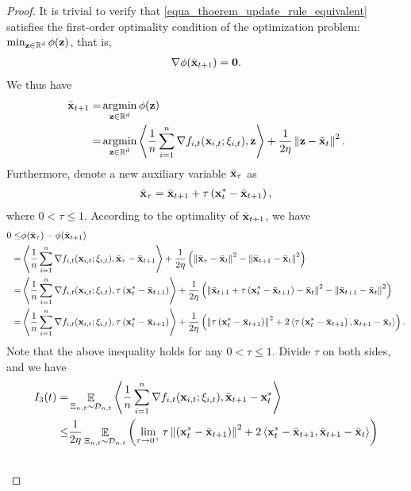 \documentclass{article}
\begin{document}
\begin{proof}
It is trivial to verify that \eqref{equa_thoerem_update_rule_equivalent} satisfies the first-order optimality condition of the optimization problem: $\min_{{\bf z}\in\mathbb{R}^d} \phi({\bf z})$, that is,
\begin{align}
\nonumber
\nabla \phi(\bar{{\bf x}}_{t+1}) = {\bf 0}.
\end{align} We thus have 
\begin{align}
\nonumber
\bar{\x}_{t+1} = & \argmin_{\z\in\RR^d} \phi(\z) \\ \nonumber
= & \argmin_{\z\in\RR^d} \lrangle{\frac{1}{n}\sum_{i=1}^n \nabla f_{i,t}(\x_{i,t};\xi_{i,t}), \z} + \frac{1}{2\eta}\lrnorm{\z - \bar{\x}_t}^2.
\end{align} Furthermore, denote a new auxiliary variable $\bar{{\bf x}}_{\tau}$ as  
\begin{align}
\nonumber
\bar{{\bf x}}_{\tau} = \bar{{\bf x}}_{t+1} + \tau \left( {\bf x}_t^\ast - \bar{{\bf x}}_{t+1} \right),
\end{align} where $0< \tau \le 1$. According to the optimality of $\bar{{\bf x}}_{t+1}$, we have
\begin{align}
\nonumber
0 \le & \phi(\bar{{\bf x}}_{\tau}) - \phi(\bar{{\bf x}}_{t+1}) \\ \nonumber
= & \left\langle\frac{1}{n}\sum_{i=1}^n \nabla f_{i,t}({\bf x}_{i,t};\xi_{i,t}), \bar{{\bf x}}_{\tau} - \bar{{\bf x}}_{t+1} \right\rangle + \frac{1}{2\eta}\left(  \left\lVert\bar{{\bf x}}_{\tau} - \bar{{\bf x}}_t\right\rVert^2 - \left\lVert\bar{{\bf x}}_{t+1} - \bar{{\bf x}}_t\right\rVert^2  \right) \\ \nonumber
= & \left\langle\frac{1}{n}\sum_{i=1}^n \nabla f_{i,t}({\bf x}_{i,t};\xi_{i,t}), \tau \left( {\bf x}_t^\ast - \bar{{\bf x}}_{t+1} \right) \right\rangle + \frac{1}{2\eta}\left(  \left\lVert\bar{{\bf x}}_{t+1} + \tau \left( {\bf x}_t^\ast - \bar{{\bf x}}_{t+1} \right) - \bar{{\bf x}}_t\right\rVert^2 - \left\lVert\bar{{\bf x}}_{t+1} - \bar{{\bf x}}_t\right\rVert^2  \right) \\ \nonumber
= & \left\langle\frac{1}{n}\sum_{i=1}^n \nabla f_{i,t}({\bf x}_{i,t};\xi_{i,t}), \tau \left( {\bf x}_t^\ast - \bar{{\bf x}}_{t+1} \right) \right\rangle + \frac{1}{2\eta}\left(  \left\lVert\tau \left( {\bf x}_t^\ast - \bar{{\bf x}}_{t+1} \right)\right\rVert^2 + 2\left\langle\tau \left( {\bf x}_t^\ast - \bar{{\bf x}}_{t+1} \right), \bar{{\bf x}}_{t+1} - \bar{{\bf x}}_t  \right\rangle  \right).
\end{align} Note that the above inequality holds for any $0< \tau \le 1$. Divide $\tau$ on both sides, and we have
\begin{align}
\nonumber
I_3(t) = & \EE_{ \Xi_{n,t} \sim \Dcal_{n,t} } \lrangle{\frac{1}{n}\sum_{i=1}^n \nabla f_{i,t}(\x_{i,t};\xi_{i,t}), \bar{\x}_{t+1} - \x_t^\ast} \\ \nonumber 
\le & \frac{1}{2\eta}\EE_{ \Xi_{n,t} \sim \Dcal_{n,t} }\lrincir{ \lim_{\tau \rightarrow 0^+}\tau \lrnorm{\lrincir{\x_t^\ast - \bar{\x}_{t+1}}}^2 + 2\lrangle{ \x_t^\ast - \bar{\x}_{t+1}, \bar{\x}_{t+1} - \bar{\x}_t } } \\ \nonumber

\end{align}
\end{proof}
\end{document}
